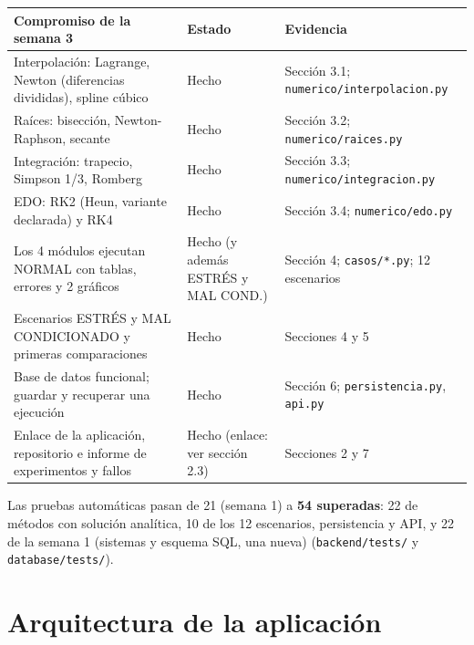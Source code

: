 \documentclass[11pt,letterpaper]{article}
\begin{document}
{\small
\begin{longtable}{p{6.0cm}p{2.6cm}p{6.6cm}}
\toprule
\textbf{Compromiso de la semana 3} & \textbf{Estado} & \textbf{Evidencia}\\
\midrule
Interpolación: Lagrange, Newton (diferencias divididas), spline cúbico & Hecho & Sección 3.1; \texttt{numerico/interpolacion.py}\\
Raíces: bisección, Newton-Raphson, secante & Hecho & Sección 3.2; \texttt{numerico/raices.py}\\
Integración: trapecio, Simpson 1/3, Romberg & Hecho & Sección 3.3; \texttt{numerico/integracion.py}\\
EDO: RK2 (Heun, variante declarada) y RK4 & Hecho & Sección 3.4; \texttt{numerico/edo.py}\\
Los 4 módulos ejecutan NORMAL con tablas, errores y 2 gráficos & Hecho (y además ESTRÉS y MAL COND.) & Sección 4; \texttt{casos/*.py}; 12 escenarios\\
Escenarios ESTRÉS y MAL CONDICIONADO y primeras comparaciones & Hecho & Secciones 4 y 5\\
Base de datos funcional; guardar y recuperar una ejecución & Hecho & Sección 6; \texttt{persistencia.py}, \texttt{api.py}\\
Enlace de la aplicación, repositorio e informe de experimentos y fallos & Hecho (enlace: ver sección 2.3) & Secciones 2 y 7\\
\bottomrule
\end{longtable}}

Las pruebas automáticas pasan de 21 (semana 1) a \textbf{54 superadas}: 22 de métodos con solución analítica, 10 de los 12 escenarios, persistencia y API, y 22 de la semana 1 (sistemas y esquema SQL, una nueva) (\texttt{backend/tests/} y \texttt{database/tests/}).

\section{Arquitectura de la aplicación}
\end{document}
